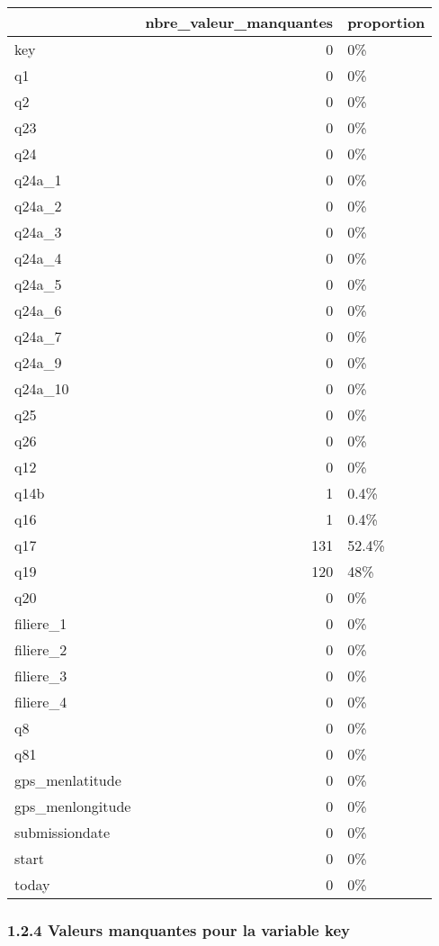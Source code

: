 \documentclass[
]{article}
\begin{document}
\begin{tabular}{l|r|l}
\hline
  & nbre\_valeur\_manquantes & proportion\\
\hline
key & 0 & 0\%\\
\hline
q1 & 0 & 0\%\\
\hline
q2 & 0 & 0\%\\
\hline
q23 & 0 & 0\%\\
\hline
q24 & 0 & 0\%\\
\hline
q24a\_1 & 0 & 0\%\\
\hline
q24a\_2 & 0 & 0\%\\
\hline
q24a\_3 & 0 & 0\%\\
\hline
q24a\_4 & 0 & 0\%\\
\hline
q24a\_5 & 0 & 0\%\\
\hline
q24a\_6 & 0 & 0\%\\
\hline
q24a\_7 & 0 & 0\%\\
\hline
q24a\_9 & 0 & 0\%\\
\hline
q24a\_10 & 0 & 0\%\\
\hline
q25 & 0 & 0\%\\
\hline
q26 & 0 & 0\%\\
\hline
q12 & 0 & 0\%\\
\hline
q14b & 1 & 0.4\%\\
\hline
q16 & 1 & 0.4\%\\
\hline
q17 & 131 & 52.4\%\\
\hline
q19 & 120 & 48\%\\
\hline
q20 & 0 & 0\%\\
\hline
filiere\_1 & 0 & 0\%\\
\hline
filiere\_2 & 0 & 0\%\\
\hline
filiere\_3 & 0 & 0\%\\
\hline
filiere\_4 & 0 & 0\%\\
\hline
q8 & 0 & 0\%\\
\hline
q81 & 0 & 0\%\\
\hline
gps\_menlatitude & 0 & 0\%\\
\hline
gps\_menlongitude & 0 & 0\%\\
\hline
submissiondate & 0 & 0\%\\
\hline
start & 0 & 0\%\\
\hline
today & 0 & 0\%\\
\hline
\end{tabular}

\hypertarget{valeurs-manquantes-pour-la-variable-key}{%
\subsubsection{1.2.4 Valeurs manquantes pour la variable
key}\label{valeurs-manquantes-pour-la-variable-key}}
\end{document}
